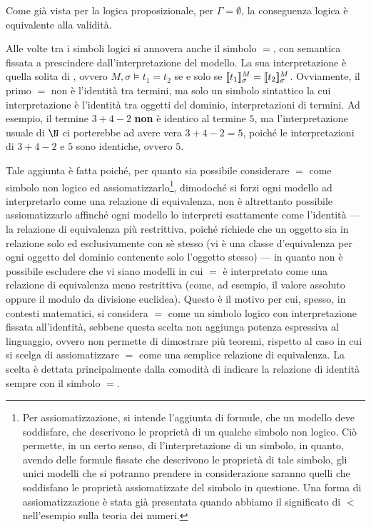 Come già vista per la logica proposizionale, per \(\Gamma = \emptyset\), la conseguenza logica è equivalente alla validità.

Alle volte tra i simboli logici si annovera anche il simbolo \(=\), con semantica fissata a prescindere dall'interpretazione del modello. La sua interpretazione è quella solita di , ovvero \(M,\sigma\models t_1 = t_2\) se e solo se \(\den{t_1}[M][\sigma] = \den{t_2}[M][\sigma]\). Ovviamente, il primo \(=\) non è l'identità tra termini, ma solo un simbolo sintattico la cui interpretazione è l'identità tra oggetti del dominio, interpretazioni di termini. Ad esempio, il termine \(3+4-2\) \textbf{non} è identico al termine \(5\), ma l'interpretazione usuale di \(\N\) ci porterebbe ad avere vera \(3+4-2 = 5\), poiché le interpretazioni di \(3+4-2\) e \(5\) sono identiche, ovvero \(5\).

Tale aggiunta è fatta poiché, per quanto sia possibile considerare \(=\) come simbolo non logico ed assiomatizzarlo\footnote{Per assiomatizzazione, si intende l'aggiunta di formule, che un modello deve soddisfare, che descrivono le proprietà di un qualche simbolo non logico. Ciò permette, in un certo senso, di  l'interpretazione di un simbolo, in quanto, avendo delle formule fissate che descrivono le proprietà di tale simbolo, gli unici modelli che si potranno prendere in considerazione saranno quelli che soddisfano le proprietà assiomatizzate del simbolo in questione. Una forma di assiomatizzazione è stata già presentata quando abbiamo  il significato di \(\overline{<}\) nell'esempio sulla teoria dei numeri.}, dimodoché si forzi ogni modello ad interpretarlo come una relazione di equivalenza, non è altrettanto possibile assiomatizzarlo affinché ogni modello lo interpreti esattamente come l'identità --- la relazione di equivalenza più restrittiva, poiché richiede che un oggetto sia in relazione solo ed esclusivamente con sè stesso (vi è una classe d'equivalenza per ogni oggetto del dominio contenente solo l'oggetto stesso) --- in quanto non è possibile escludere che vi siano modelli in cui \(=\) è interpretato come una relazione di equivalenza meno restrittiva (come, ad esempio, il valore assoluto oppure il modulo da divisione euclidea). Questo è il motivo per cui, spesso, in contesti matematici, si considera \(=\) come un simbolo logico con interpretazione fissata all'identità, sebbene questa scelta non aggiunga potenza espressiva al linguaggio, ovvero non permette di dimostrare più teoremi, rispetto al caso in cui si scelga di assiomatizzare \(=\) come una semplice relazione di equivalenza. La scelta è dettata principalmente dalla comodità di indicare la relazione di identità sempre con il simbolo \(=\).

